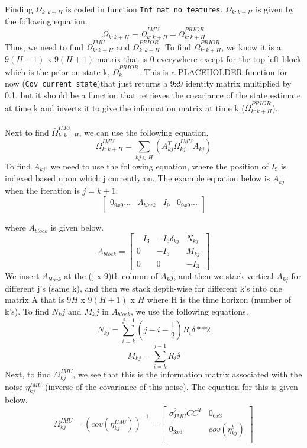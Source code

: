 Finding $\bar{\Omega}_{k:k+H}$ is coded in function \texttt{Inf\_mat\_no\_features}. $\bar{\Omega}_{k:k+H}$ is given by the following equation.
\begin{equation}
    \bar{\Omega}_{k:k+H} = \bar{\Omega}_{k:k+H}^{IMU} + \bar{\Omega}_{k:k+H}^{PRIOR}
    \label{eq:omega_IMU}
\end{equation}
Thus, we need to find $\bar{\Omega}_{k:k+H}^{IMU}$ and $\bar{\Omega}_{k:k+H}^{PRIOR}$. To find $\bar{\Omega}_{k:k+H}^{PRIOR}$, we know it is a $9(H+1)$ x $9(H+1)$ matrix that is 0 everywhere except for the top left block which is the prior on state k, $\bar{\Omega}_{k}^{PRIOR}$. This is a PLACEHOLDER function for now (\texttt{Cov\_current\_state})that just returns a 9x9 identity matrix multiplied by 0.1, but it should be a function that retrieves the covariance of the state estimate at time k and inverts it to give the information matrix at time k ($\bar{\Omega}_{k:k+H}^{PRIOR}$). \\ \\
Next to find $\bar{\Omega}_{k:k+H}^{IMU}$, we can use the following equation.
\begin{equation}
    \bar{\Omega}_{k:k+H}^{IMU} = \sum_{kj \in H} (A^T_{kj}\bar{\Omega}_{kj}^{IMU}A_{kj})
\end{equation}
To find $A_{kj}$, we need to use the following equation, where the position of $I_9$ is indexed based upon which j currently on. The example equation below is $A_{kj}$ when the iteration is $j = k + 1$.
\[
\begin{bmatrix}
    0_{9x9} ... & A_{block} & I_9 & 0_{9x9} ... \\
\end{bmatrix}\]

where $A_{block}$ is given below.
\[A_{block} = 
\begin{bmatrix}
-I_3 & -I_3\delta_{kj} & N_{kj} \\
0 & -I_3 & M_{kj} \\
0 & 0 & -I_3 \
\end{bmatrix}\]
We insert $A_{block}$ at the (j x 9)th column of $A_kj$, and then we stack vertical $A_{kj}$ for different j's (same k), and then we stack depth-wise for different k's into one matrix A that is $9H$ x $9(H+1)$ x $H$ where H is the time horizon (number of k's). To find $N_kj$ and $M_kj$ in $A_{block}$, we use the following equations. 
\begin{equation}
    N_{kj} = \sum_{i=k}^{j-1}(j-i-\frac{1}{2})R_i\delta**2
\end{equation}
\begin{equation}
    M_{kj} = \sum_{i=k}^{j-1}R_i\delta
\end{equation}
Next, to find $\Omega_{kj}^{IMU}$, we see that this is the information matrix associated with the noise $\eta_{kj}^{IMU}$ (inverse of the covariance of this noise). The equation for this is given below. 
\[\Omega_{kj}^{IMU} = (cov(\eta_{kj}^{IMU}))^{-1} =
\begin{bmatrix}
\sigma_{IMU}^2CC^T & 0_{6x3} \\
0_{3x6} & cov(\eta_{kj}^b) \\
\end{bmatrix}
\]

